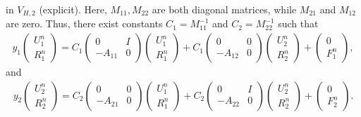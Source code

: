 \documentclass[preprint,12pt]{elsarticle}
\begin{document}
in $V_{H,2}$ (explicit). Here, $M_{11},M_{22}$ are both diagonal matrices, while $M_{21}$ and $M_{12}$ are zero. 
Thus, there exist constants $C_1=M_{11}^{-1}$ and $C_2=M_{22}^{-1}$ such that
\begin{equation}\label{rkh1}
\begin{aligned}
y_1\left(\begin{matrix}
    U^n_1\\R^n_1
\end{matrix}\right)=C_1\left(\begin{matrix}
    0&I\\-A_{11}&0
\end{matrix}\right)\left(\begin{matrix}
    U^n_1\\R^n_1
\end{matrix}\right)+C_1\left(\begin{matrix}
    0&0\\-A_{12}&0
\end{matrix}\right)\left(\begin{matrix}
    U^n_2\\R^n_2
\end{matrix}\right)+\left(\begin{matrix}
    0\\F_1^n
\end{matrix}\right),
\end{aligned}
\end{equation}
and
\begin{equation}\label{rkh2}
\begin{aligned}
y_2\left(\begin{matrix}
    U^n_2\\R^n_2
\end{matrix}\right)=C_2\left(\begin{matrix}
    0&0\\-A_{21}&0
\end{matrix}\right)\left(\begin{matrix}
    U^n_1\\R^n_1
\end{matrix}\right)+C_2\left(\begin{matrix}
    0&I\\-A_{22}&0
\end{matrix}\right)\left(\begin{matrix}
    U^n_2\\R^n_2
\end{matrix}\right)+\left(\begin{matrix}
    0\\F_2^n
\end{matrix}\right).
\end{aligned}
\end{equation}
\end{document}
